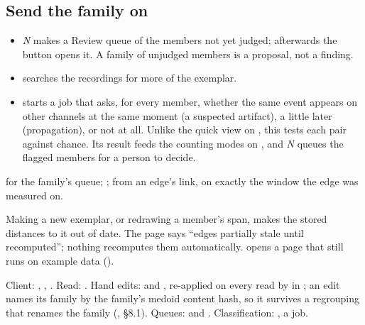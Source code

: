 \subsection{Send the family on}\label{sec:library-family-send}
\begin{itemize}
  \item {} \emph{N}  makes a Review queue of the members not
    yet judged; afterwards the button opens it. A family of unjudged members is a proposal,
    not a finding.
  \item {} searches the recordings for more of the exemplar.
  \item {} starts a job that asks, for every member, whether the
    same event appears on other channels at the same moment (a suspected artifact), a little
    later (propagation), or not at all. Unlike the quick view on
    , this tests each pair against chance. Its result feeds
    the counting modes on , and  \emph{N}
     queues the flagged members for a person to decide.
\end{itemize}


 for the family's queue; ;
 from an edge's  link, on exactly the window the
edge was measured on.

\begin{watchout}
Making a new exemplar, or redrawing a member's span, makes the stored distances to it out of
date. The page says ``edges partially stale until recomputed''; nothing recomputes them
automatically.  opens a page that still runs on example data
().
\end{watchout}

\begin{underthehood}[Family]
Client: , ,
. Read: . Hand edits:
 and , re-applied on every read by
 in ; an edit names its family by
the family's medoid content hash, so it survives a regrouping that renames the family
(, §8.1). Queues:  and . Classification:
, a  job.
\end{underthehood}

